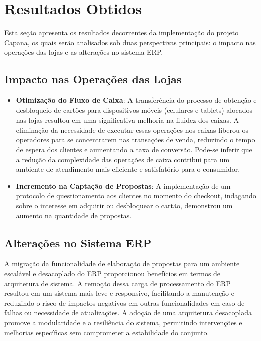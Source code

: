 \chapter{Resultados Obtidos}

Esta seção apresenta os resultados decorrentes da implementação do projeto Capana, os quais serão 
analisados sob duas perspectivas principais: o impacto nas operações das lojas e as alterações no 
sistema ERP.

\section{Impacto nas Operações das Lojas}

\begin{itemize}

    \item \textbf{Otimização do Fluxo de Caixa}: A transferência do processo de 
    obtenção e desbloqueio de cartões para dispositivos móveis (celulares e tablets) 
    alocados nas lojas resultou em uma significativa melhoria na fluidez dos caixas. 
    A eliminação da necessidade de executar essas operações nos caixas liberou os 
    operadores para se concentrarem nas transações de venda, reduzindo o tempo de 
    espera dos clientes e aumentando a taxa de conversão. Pode-se inferir que a 
    redução da complexidade das operações de caixa contribui para um ambiente de 
    atendimento mais eficiente e satisfatório para o consumidor.

    \item \textbf{Incremento na Captação de Propostas}: A implementação de um protocolo de questionamento aos clientes no 
    momento do checkout, indagando sobre o interesse em adquirir ou desbloquear o cartão, demonstrou um aumento na 
    quantidade de propostas.

\end{itemize}

\section{Alterações no Sistema ERP}

A migração da funcionalidade de elaboração de propostas para um ambiente escalável e desacoplado do ERP proporcionou 
benefícios em termos de arquitetura de sistema. A remoção dessa carga de processamento do ERP resultou em um sistema 
mais leve e responsivo, facilitando a manutenção e reduzindo o risco de impactos negativos em outras funcionalidades em 
caso de falhas ou necessidade de atualizações. A adoção de uma arquitetura desacoplada promove a modularidade e a 
resiliência do sistema, permitindo intervenções e melhorias específicas sem comprometer a estabilidade do conjunto.

